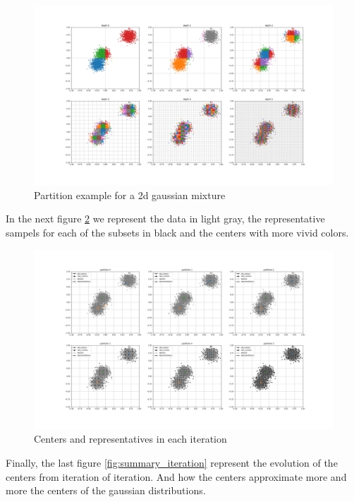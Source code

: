 \begin{figure}[!ht]
    \includegraphics[width=\linewidth]{images/alldepths.png}
    \caption{Partition example for a 2d gaussian mixture}
    \label{fig:partitions2}
\end{figure}

In the next figure \ref{fig:steps} we represent the data in light gray, the representative sampels for each of the subsets in black and the centers with more vivid colors.

\begin{figure}[!ht]
    \includegraphics[width=\linewidth]{images/steps.png}
    \caption{Centers and representatives in each iteration}
    \label{fig:steps}
\end{figure}

Finally, the last figure \ref{fig:summary_iteration} represent the evolution of the centers from iteration of iteration. And how the centers approximate more and more the centers of the gaussian distributions.

